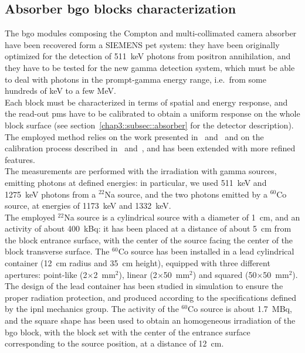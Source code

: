 \subsection{Absorber \gls{bgo} blocks characterization}\label{chap3::subsec::absBGOchar}

The \gls{bgo} modules composing the Compton and multi-collimated camera absorber have been recovered form a SIEMENS \gls{pet} system: they have been originally optimized for the detection of 511~keV photons from positron annihilation, and they have to be tested for the new gamma detection system, which must be able to deal with photons in the prompt-gamma energy range, i.e.~from some hundreds of keV to a few MeV.\\ 
Each block must be characterized in terms of spatial and energy response, and the read-out \glspl{pm} have to be calibrated to obtain a uniform response on the whole block surface (see section~\ref{chap3::subsec::absorber} for the detector description). The employed method relies on the work presented in~\cite{Rogers1994} and~\cite{Tornai1994} and on the calibration process described in~\cite{Golnik2015} and~\cite{HuesoGonzalez2015}, and has been extended with more refined features.\\
The measurements are performed with the irradiation with gamma sources, emitting photons at defined energies: in particular, we used 511~keV and 1275~keV photons from a $^{22}$Na source, and the two photons emitted by a $^{60}$Co source, at energies of 1173~keV and 1332~keV.\\
The employed $^{22}$Na source is a cylindrical source with a diameter of 1~cm, and an activity of about 400~kBq: it has been placed at a distance of about 5~cm from the block entrance surface, with the center of the source facing the center of the block transverse surface. The $^{60}$Co source has been installed in a lead cylindrical container (12~cm radius and 35~cm height), equipped with three different apertures: point-like (2$\times$2~mm$^2$), linear (2$\times$50~mm$^2$) and squared (50$\times$50~mm$^2$). The design of the lead container has been studied in simulation to ensure the proper radiation protection, and produced according to the specifications defined by the \gls{ipnl} mechanics group. The activity of the $^{60}$Co source is about 1.7~MBq, and the square shape has been used to obtain an homogeneous irradiation of the \gls{bgo} block, with the block set with the center of the entrance surface corresponding to the source position, at a distance of 12~cm.\\
